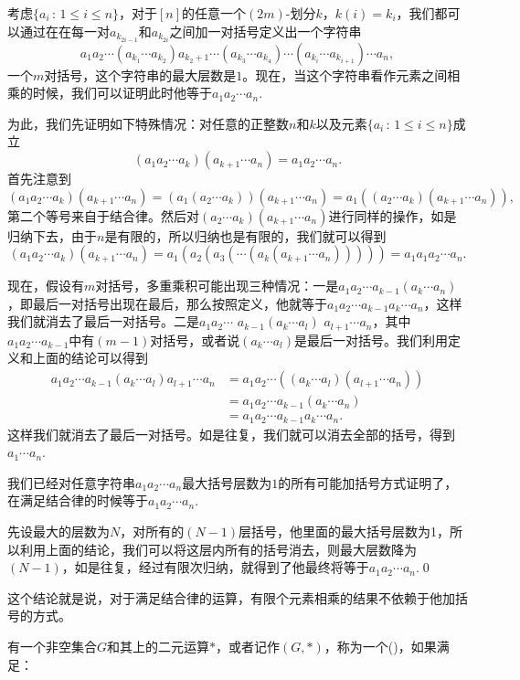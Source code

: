 考虑$\{a_i\, :\, 1\leq i\leq n\}$，对于$[n]$的任意一个$(2m)$-划分$k$，$k(i)=k_i$，我们都可以通过在在每一对$a_{k_{2i-1}}$和$a_{k_{2i}}$之间加一对括号定义出一个字符串
\[
	a_1a_2\cdots (a_{k_1}\cdots a_{k_2})a_{k_2+1}\cdots (a_{k_3}\cdots a_{k_4})\cdots (a_{k_i}\cdots a_{k_{i+1}})\cdots a_n,
\]
一个$m$对括号，这个字符串的最大层数是$1$。现在，当这个字符串看作元素之间相乘的时候，我们可以证明此时他等于$a_1a_2\cdots a_n$.

为此，我们先证明如下特殊情况：对任意的正整数$n$和$k$以及元素$\{a_i\,:\, 1\leq i \leq n\}$成立
\[(a_1a_2\cdots a_{k})(a_{k+1}\cdots a_{n})=a_1a_2\cdots a_n.\]
首先注意到
\[
(a_1a_2\cdots a_{k})(a_{k+1}\cdots a_{n})=(a_1(a_2\cdots a_{k}))(a_{k+1}\cdots a_{n})=a_1((a_2\cdots a_{k})(a_{k+1}\cdots a_{n})),
\]
第二个等号来自于结合律。然后对$(a_2\cdots a_{k})(a_{k+1}\cdots a_{n})$进行同样的操作，如是归纳下去，由于$n$是有限的，所以归纳也是有限的，我们就可以得到
\[
(a_1a_2\cdots a_{k})(a_{k+1}\cdots a_{n})=a_1(a_2(a_3(\cdots (a_{k}(a_{k+1}\cdots a_{n})))))=a_1a_1a_2\cdots a_n.
\]

现在，假设有$m$对括号，多重乘积可能出现三种情况：一是$a_1a_2\cdots a_{k-1}(a_{k}\cdots a_n)$，即最后一对括号出现在最后，那么按照定义，他就等于$a_1a_2\cdots a_{k-1}a_{k}\cdots a_n$，这样我们就消去了最后一对括号。二是$a_1a_2\cdots$ $a_{k-1}(a_{k}\cdots a_l)$ $a_{l+1}\cdots a_n$，其中$a_1a_2\cdots a_{k-1}$中有$(m-1)$对括号，或者说$(a_{k}\cdots a_l)$是最后一对括号。我们利用定义和上面的结论可以得到
\begin{align*}
	a_1a_2\cdots a_{k-1}(a_{k}\cdots a_l)a_{l+1}\cdots a_n&=a_1a_2\cdots ((a_{k}\cdots a_l)(a_{l+1}\cdots a_n))\\
	&=a_1a_2\cdots a_{k-1}(a_{k}\cdots a_n)\\
	&=a_1a_2\cdots a_{k-1}a_{k}\cdots a_n.
\end{align*}
这样我们就消去了最后一对括号。如是往复，我们就可以消去全部的括号，得到$a_1\cdots a_n$.

我们已经对任意字符串$a_1a_2\cdots a_n$最大括号层数为$1$的所有可能加括号方式证明了，在满足结合律的时候等于$a_1a_2\cdots a_n$.

先设最大的层数为$N$，对所有的$(N-1)$层括号，他里面的最大括号层数为1，所以利用上面的结论，我们可以将这层内所有的括号消去，则最大层数降为$(N-1)$，如是往复，经过有限次归纳，就得到了他最终将等于$a_1a_2\cdots a_n$.\qed 

这个结论就是说，对于满足结合律的运算，有限个元素相乘的结果不依赖于他加括号的方式。

\para 有一个非空集合$G$和其上的二元运算$*$，或者记作$(G,*)$，称为一个()，如果满足：

